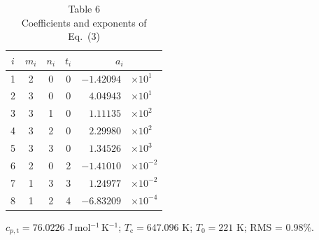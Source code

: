 \documentclass[11pt]{article}
\newcommand{\JmolK}{J\,mol$^{-1}$\,K$^{-1}$}
\begin{document}
\begin{table}[htbp]
\centering
\caption*{Table 6\\ Coefficients and exponents of Eq.~(3)}
\begin{tabular}{ccccr@{}l}
\toprule
$i$ & $m_i$ & $n_i$ & $t_i$ & \multicolumn{2}{c}{$a_i$} \\
\midrule
1 & 2 & 0 & 0 & $-1.42094$ & $\times10^{1}$ \\
2 & 3 & 0 & 0 & $4.04943$   & $\times10^{1}$ \\
3 & 3 & 1 & 0 & $1.11135$   & $\times10^{2}$ \\
4 & 3 & 2 & 0 & $2.29980$   & $\times10^{2}$ \\
5 & 3 & 3 & 0 & $1.34526$   & $\times10^{3}$ \\
6 & 2 & 0 & 2 & $-1.41010$ & $\times10^{-2}$ \\
7 & 1 & 3 & 3 & $1.24977$   & $\times10^{-2}$ \\
8 & 1 & 2 & 4 & $-6.83209$ & $\times10^{-4}$ \\
\bottomrule
\end{tabular}

\vspace{2pt}
\footnotesize $c_{p,\mathrm{t}} = 76.0226$ \JmolK;
$T_\mathrm{c} = 647.096$ K; $T_0 = 221$ K; RMS = 0.98\%.
\end{table}
\end{document}
